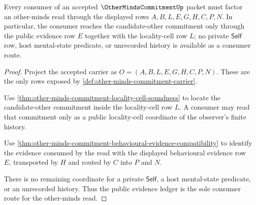 \begin{theorem}
\label{thm:other-minds-commitment-public-evidence-ledger}
Every consumer of an accepted $\OtherMindsCommitmentUp$ packet must factor an other-minds read through the displayed rows $A,B,L,E,G,H,C,P,N$. In particular, the consumer reaches the candidate-other commitment only through the public evidence row $E$ together with the locality-cell row $L$; no private $\mathsf{Self}$ row, host mental-state predicate, or unrecorded history is available as a consumer route.
\end{theorem}
\begin{proof}
Project the accepted carrier as $O=(A,B,L,E,G,H,C,P,N)$. These are the only rows exposed by \autoref{def:other-minds-commitment-carrier}.

Use \autoref{thm:other-minds-commitment-locality-cell-soundness} to locate the candidate-other commitment inside the locality-cell row $L$. A consumer may read that commitment only as a public locality-cell coordinate of the observer's finite history.

Use \autoref{thm:other-minds-commitment-behavioural-evidence-compatibility} to identify the evidence consumed by the read with the displayed behavioural evidence row $E$, transported by $H$ and routed by $C$ into $P$ and $N$.

There is no remaining coordinate for a private $\mathsf{Self}$, a host mental-state predicate, or an unrecorded history. Thus the public evidence ledger is the sole consumer route for the other-minds read.
\end{proof}

